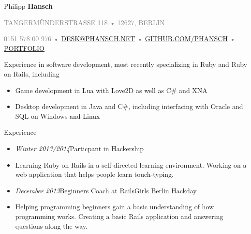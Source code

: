 \documentclass[12pt]{article}
\begin{document}
\thispagestyle{empty}



{\Huge Philipp \textbf{Hansch}}

{\footnotesize
  \textcolor{Gray}{
    \uppercase{Tangermünderstrasse 118}
    •
    \uppercase{12627, Berlin}
  }

  \textcolor{Gray}{
    0151 578 00 976
	•
    \uppercase{\href{mailto:desk@phansch.net}{desk@phansch.net} }
    •
    \uppercase{\href{http://github.com/phansch}{github.com/phansch}}
    •
    \uppercase{\href{http://portfolio.phansch.net/\#folio-mid}{Portfolio}}
  }
}

\vspace{0.5cm}

Experience in software development, most recently specializing in Ruby and Ruby on Rails, including

\begin{itemize}
  \setlength{\itemsep}{0.1cm}
  \setlength{\parskip}{0.1cm}
  \item Game development in Lua with Love2D as well as C\# and XNA
  \item Desktop development in Java and C\#, including interfacing with Oracle and SQL on Windows and Linux
\end{itemize}
\vspace{0.5cm}

{\Large Experience}
\begin{itemize}
  \setlength{\itemsep}{0cm}
  \setlength{\parskip}{0cm}

  \item[] \emph{Winter 2013/2014}\hfill Particpant in Hackership
  \item[] Learning Ruby on Rails in a self-directed learning environment. Working on a web application that helps people learn touch-typing.
\end{itemize}

\begin{itemize}
  \setlength{\itemsep}{0cm}
  \setlength{\parskip}{0cm}

  \item[] \emph{December 2013}\hfill Beginners Coach at RailsGirls Berlin Hackday
  \item[] Helping programming beginners gain a basic understanding of how programming works. Creating a basic Rails application and answering questions along the way.
\end{itemize}
\end{document}
